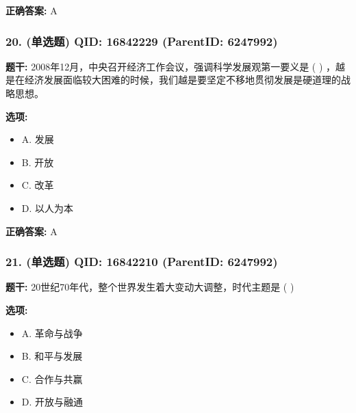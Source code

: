 \documentclass[12pt,UTF8]{ctexart}
\begin{document}
\textbf{正确答案:}
A

\vspace{0.3em}\hrulefill\vspace{0.7em}

\subsubsection*{20. (单选题) \small QID: 16842229 (ParentID: 6247992)}

\textbf{题干:}
2008年12月，中央召开经济工作会议，强调科学发展观第一要义是 ( ) ，越是在经济发展面临较大困难的时候，我们越是要坚定不移地贯彻发展是硬道理的战略思想。



\textbf{选项:}
\begin{itemize}[leftmargin=*]

  \item A. 发展

  \item B. 开放

  \item C. 改革

  \item D. 以人为本

\end{itemize}

\textbf{正确答案:}
A

\vspace{0.3em}\hrulefill\vspace{0.7em}

\subsubsection*{21. (单选题) \small QID: 16842210 (ParentID: 6247992)}

\textbf{题干:}
20世纪70年代，整个世界发生着大变动大调整，时代主题是 ( )



\textbf{选项:}
\begin{itemize}[leftmargin=*]

  \item A. 革命与战争

  \item B. 和平与发展

  \item C. 合作与共赢

  \item D. 开放与融通

\end{itemize}
\end{document}
